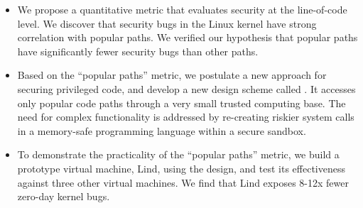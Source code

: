 \begin{itemize}\setlength\itemsep{0em}

\item
We propose a quantitative metric that evaluates security at the line-of-code level. 
We discover that security bugs in the Linux kernel have strong correlation with popular paths. 
We verified our hypothesis that popular paths have significantly fewer security bugs than other paths. 

\item
Based on the ``popular paths'' metric, we postulate a new approach for securing privileged code,
and develop a new design scheme called \lip. It
accesses only popular code paths
through a very small trusted computing base.
The need for complex functionality is addressed by re-creating riskier system calls
in a memory-safe programming language within a secure sandbox.

\item
To demonstrate the practicality of the ``popular paths'' metric, we build a prototype virtual machine, Lind, using the \lip design,
and test its effectiveness against three other virtual machines. We find that
Lind exposes 8-12x fewer zero-day kernel bugs. 
\end{itemize}

